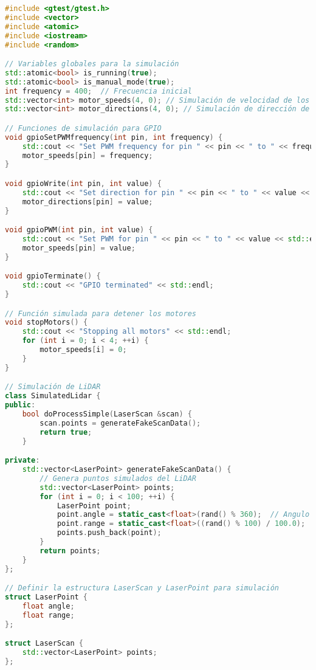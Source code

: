         \begin{lstlisting}[language={C++}, caption={Primera versi\'on del c\'odigo del sistema de control del robot}, label={Script}]
#include <gtest/gtest.h>
#include <vector>
#include <atomic>
#include <iostream>
#include <random>

// Variables globales para la simulación
std::atomic<bool> is_running(true);
std::atomic<bool> is_manual_mode(true);
int frequency = 400;  // Frecuencia inicial
std::vector<int> motor_speeds(4, 0); // Simulación de velocidad de los motores
std::vector<int> motor_directions(4, 0); // Simulación de dirección de los motores

// Funciones de simulación para GPIO
void gpioSetPWMfrequency(int pin, int frequency) {
    std::cout << "Set PWM frequency for pin " << pin << " to " << frequency << std::endl;
    motor_speeds[pin] = frequency;
}

void gpioWrite(int pin, int value) {
    std::cout << "Set direction for pin " << pin << " to " << value << std::endl;
    motor_directions[pin] = value;
}

void gpioPWM(int pin, int value) {
    std::cout << "Set PWM for pin " << pin << " to " << value << std::endl;
    motor_speeds[pin] = value;
}

void gpioTerminate() {
    std::cout << "GPIO terminated" << std::endl;
}

// Función simulada para detener los motores
void stopMotors() {
    std::cout << "Stopping all motors" << std::endl;
    for (int i = 0; i < 4; ++i) {
        motor_speeds[i] = 0;
    }
}

// Simulación de LiDAR
class SimulatedLidar {
public:
    bool doProcessSimple(LaserScan &scan) {
        scan.points = generateFakeScanData();
        return true;
    }

private:
    std::vector<LaserPoint> generateFakeScanData() {
        // Genera puntos simulados del LiDAR
        std::vector<LaserPoint> points;
        for (int i = 0; i < 100; ++i) {
            LaserPoint point;
            point.angle = static_cast<float>(rand() % 360);  // Angulo aleatorio
            point.range = static_cast<float>((rand() % 100) / 100.0);  // Rango aleatorio entre 0 y 1
            points.push_back(point);
        }
        return points;
    }
};

// Definir la estructura LaserScan y LaserPoint para simulación
struct LaserPoint {
    float angle;
    float range;
};

struct LaserScan {
    std::vector<LaserPoint> points;
};


\end{lstlisting}
